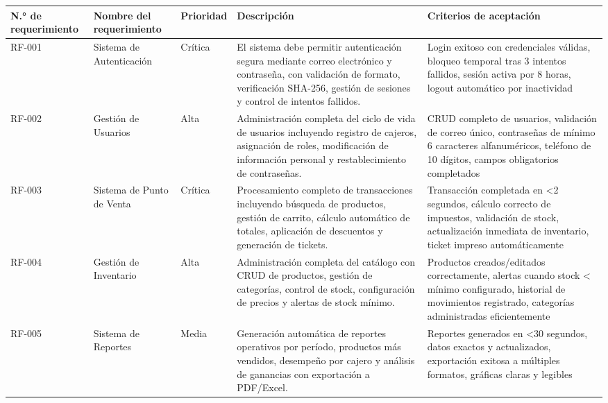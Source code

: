 \documentclass[12pt,letterpaper]{article}
\begin{document}
\begin{longtable}{|>{\centering}p{1.5cm}|p{3.5cm}|>{\centering}p{2cm}|p{6.5cm}|>{\centering\arraybackslash}p{2.5cm}|}
\hline
\rowcolor{cobrablue!20}
\textbf{N.° de requerimiento} & \textbf{Nombre del requerimiento} & \textbf{Prioridad} & \textbf{Descripción} & \textbf{Criterios de aceptación} \\
\hline
\endhead

RF-001 & Sistema de Autenticación & Crítica & El sistema debe permitir autenticación segura mediante correo electrónico y contraseña, con validación de formato, verificación SHA-256, gestión de sesiones y control de intentos fallidos. & Login exitoso con credenciales válidas, bloqueo temporal tras 3 intentos fallidos, sesión activa por 8 horas, logout automático por inactividad \\
\hline

RF-002 & Gestión de Usuarios & Alta & Administración completa del ciclo de vida de usuarios incluyendo registro de cajeros, asignación de roles, modificación de información personal y restablecimiento de contraseñas. & CRUD completo de usuarios, validación de correo único, contraseñas de mínimo 6 caracteres alfanuméricos, teléfono de 10 dígitos, campos obligatorios completados \\
\hline

RF-003 & Sistema de Punto de Venta & Crítica & Procesamiento completo de transacciones incluyendo búsqueda de productos, gestión de carrito, cálculo automático de totales, aplicación de descuentos y generación de tickets. & Transacción completada en <2 segundos, cálculo correcto de impuestos, validación de stock, actualización inmediata de inventario, ticket impreso automáticamente \\
\hline

RF-004 & Gestión de Inventario & Alta & Administración completa del catálogo con CRUD de productos, gestión de categorías, control de stock, configuración de precios y alertas de stock mínimo. & Productos creados/editados correctamente, alertas cuando stock < mínimo configurado, historial de movimientos registrado, categorías administradas eficientemente \\
\hline

RF-005 & Sistema de Reportes & Media & Generación automática de reportes operativos por período, productos más vendidos, desempeño por cajero y análisis de ganancias con exportación a PDF/Excel. & Reportes generados en <30 segundos, datos exactos y actualizados, exportación exitosa a múltiples formatos, gráficas claras y legibles \\
\hline


\end{longtable}
\end{document}
